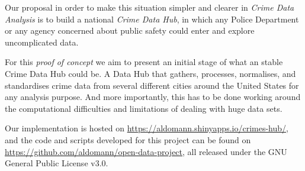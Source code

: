 Our proposal in order to make this situation simpler and clearer in \emph{Crime Data Analysis} is to build a national \emph{Crime Data Hub}, in which any Police Department or any agency concerned about public safety could enter and explore uncomplicated data.

For this \emph{proof of concept} we aim to present an initial stage of what an stable Crime Data Hub could be. A Data Hub that gathers, processes, normalises, and standardises crime data from several different cities around the United States for any analysis purpose. And more importantly, this has to be done working around the computational difficulties and limitations of dealing with huge data sets.

\bigskip
Our implementation is hosted on \url{https://aldomann.shinyapps.io/crimes-hub/}, and the code and scripts developed for this project can be found on \url{https://github.com/aldomann/open-data-project}, all released under the GNU General Public License v3.0.
